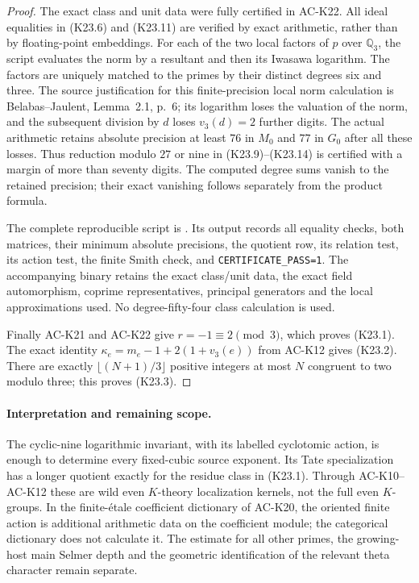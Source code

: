 \begin{proof}
The exact class and unit data were fully certified in AC-K22.
All ideal equalities in (K23.6) and (K23.11) are verified
by exact arithmetic, rather than by floating-point embeddings.
For each of the two local factors of $p$ over $\mathbb Q_3$,
the script evaluates the norm by a resultant and then
its Iwasawa logarithm.  The factors are uniquely matched
to the primes by their distinct degrees six and three.
The source justification for this finite-precision local
norm calculation is Belabas--Jaulent, Lemma~2.1, p.~6;
its logarithm loses the valuation of the norm, and the
subsequent division by $d$ loses $v_3(d)=2$ further digits.
The actual arithmetic retains absolute precision at least
$76$ in $M_0$ and $77$ in $G_0$ after all these losses.
Thus reduction modulo $27$ or nine in (K23.9)--(K23.14)
is certified with a margin of more than seventy digits.
The computed degree sums vanish to the retained precision;
their exact vanishing follows separately from the product formula.

The complete reproducible script is
.
Its output records all equality checks, both matrices,
their minimum absolute precisions, the quotient row,
its relation test, its action test, the finite Smith check,
and \texttt{CERTIFICATE\_PASS=1}.
The accompanying binary retains the exact class/unit data,
the exact field automorphism, coprime representatives,
principal generators and the local approximations used.
No degree-fifty-four class calculation is used.

Finally AC-K21 and AC-K22 give $r=-1\equiv2\pmod3$,
which proves (K23.1).
The exact identity
$\kappa_e=m_e-1+2(1+v_3(e))$ from AC-K12 gives
(K23.2).
There are exactly $\lfloor(N+1)/3\rfloor$ positive
integers at most $N$ congruent to two modulo three;
this proves (K23.3).
\end{proof}

\paragraph{Interpretation and remaining scope.}
The cyclic-nine logarithmic invariant, with its labelled
cyclotomic action, is enough to determine every fixed-cubic
source exponent.  Its Tate specialization has a longer
quotient exactly for the residue class in (K23.1).
Through AC-K10--AC-K12 these are wild even $K$-theory
localization kernels, not the full even $K$-groups.
In the finite-\'etale coefficient dictionary of
AC-K20, the oriented finite action is additional arithmetic
data on the coefficient module; the categorical dictionary
does not calculate it.  The estimate for all other primes,
the growing-host main Selmer depth and the geometric
identification of the relevant theta character remain separate.
